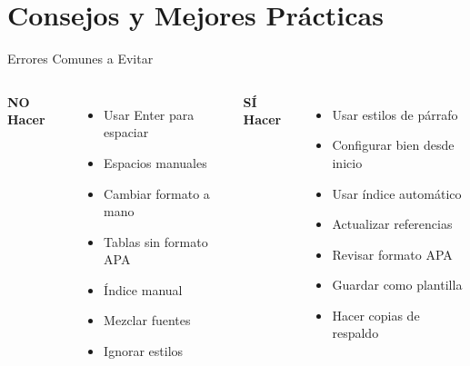 \documentclass[aspectratio=169,11pt]{beamer}
\begin{document}
\section{Consejos y Mejores Prácticas}

\begin{frame}{Errores Comunes a Evitar}
  \begin{columns}[T]
    \textbf{\textcolor{warningred}{NO Hacer}}
    \begin{itemize}
      \item[\faTimesCircle] Usar Enter para espaciar
      \item[\faTimesCircle] Espacios manuales
      \item[\faTimesCircle] Cambiar formato a mano
      \item[\faTimesCircle] Tablas sin formato APA
      \item[\faTimesCircle] Índice manual
      \item[\faTimesCircle] Mezclar fuentes
      \item[\faTimesCircle] Ignorar estilos
    \end{itemize}
    
    \textbf{\textcolor{successgreen}{SÍ Hacer}}
    \begin{itemize}
      \item[\faCheckCircle] Usar estilos de párrafo
      \item[\faCheckCircle] Configurar bien desde inicio
      \item[\faCheckCircle] Usar índice automático
      \item[\faCheckCircle] Actualizar referencias
      \item[\faCheckCircle] Revisar formato APA
      \item[\faCheckCircle] Guardar como plantilla
      \item[\faCheckCircle] Hacer copias de respaldo
    \end{itemize}
  \end{columns}
\end{frame}
\end{document}

